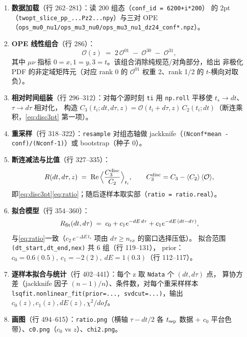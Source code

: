 \documentclass[UTF8,11pt]{ctexart}
\begin{document}
\begin{enumerate}
  \item \textbf{数据加载}（行 262--281）：读 200 组态（\texttt{conf\_id = 6200+i*200}）
  的 2pt（\texttt{twopt\_slice\_pp\_...Pz2...npy}）与三对 OPE
  （\texttt{ops\_mu0\_nu1/ops\_mu3\_nu0/ops\_mu3\_nu1\_dz24\_conf*.npz}）。
  \item \textbf{OPE 线性组合}（行 286）：
  \begin{equation}
    \label{eq:ope_comb}
    \mathcal{O}(z)\;=\;2\,\mathcal{O}^{01}\;-\;\mathcal{O}^{30}\;-\;\mathcal{O}^{31},
  \end{equation}
  其中 $\mu\nu$ 指标 $0{=}x,1{=}y,3{=}t$。该组合消除纯规范/对角部分，给出
  非极化 PDF 的非定域矩阵元（对应 rank 0 的 $\mathcal O^{01}$ 权重 2、rank 1/2 的 $t$-横向对取负）。
  \item \textbf{相对时间组装}（行 296--312）：对每个源时刻 \texttt{ti} 用
  \texttt{np.roll} 平移使 $t_s\to dt$、$\tau\to d\tau$ 相对化，
  构造 $C_3(t_i;dt,d\tau,z)=\mathcal O(t_i+d\tau,z)\,C_2(t_i;dt)$（断连乘积，\ref{eq:disc3pt} 第一项）。
  \item \textbf{重采样}（行 318--322）：\texttt{resample} 对组态轴做
  jackknife（\texttt{(Nconf*mean - conf)/(Nconf-1)}）或 bootstrap（种子 0）。
  \item \textbf{断连减法与比值}（行 327--335）：
  \begin{equation}
    R(dt,d\tau,z)\;=\;\mathrm{Re}\,\Big\langle
    \frac{C_3^{\rm disc}}{C_2}\Big\rangle_{t_i},
    \qquad
    C_3^{\rm disc} = C_3 - \langle C_2\rangle\,\langle\mathcal O\rangle,
  \end{equation}
  即\eqref{eq:disc3pt}\eqref{eq:ratio}；随后逐样本取实部（\texttt{ratio = ratio.real}）。
  \item \textbf{拟合模型}（行 354--360）：
  \begin{equation}
    \label{eq:model}
    R_{\rm fit}(dt,d\tau)\;=\;c_0 + c_1 e^{-dE\,d\tau} + c_1 e^{-dE\,(dt-d\tau)},
  \end{equation}
  与\eqref{eq:ratio}一致（$c_2\,e^{-\Delta E\,t_s}$ 项由 $d\tau\ge n_{ex}$ 的窗口选择压低）。
  拟合范围 \texttt{(dt\_start,dt\_end,nex)} 共 6 组（行 119--131），
  prior：$c_0=0.6(0.5),\ c_1=-2(2),\ dE=1(0.3)$（行 112--117）。
  \item \textbf{逐样本拟合与统计}（行 402--441）：每个 z 取 \texttt{Ndata} 个 $(dt,d\tau)$ 点，
  算协方差（jackknife 因子 $(n{-}1)/n$）、条件数，对每个重采样样本
  \texttt{lsqfit.nonlinear\_fit(prior=..., svdcut=...)}，输出 $c_0(z),c_1(z),dE(z),\chi^2/dof$。
  \item \textbf{画图}（行 494--615）：\texttt{ratio.png}（横轴 $\tau - dt/2$ 各 $t_{\rm sep}$ 数据 +
  $c_0$ 平台色带）、\texttt{c0.png}（$c_0$ vs $z$）、\texttt{chi2.png}。
\end{enumerate}
\end{document}
